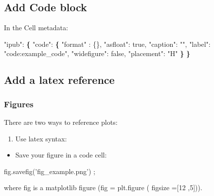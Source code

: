 \documentclass[10pt,parskip=half,
	toc=sectionentrywithdots,
	bibliography=totocnumbered,
	captions=tableheading,numbers=noendperiod]{scrartcl}
\providecommand{\tightlist}{%
  \setlength{\itemsep}{0pt}\setlength{\parskip}{0pt}}
\newenvironment{Shaded}{}{}
\newcommand{\KeywordTok}[1]{\textcolor[rgb]{0.00,0.44,0.13}{\textbf{{#1}}}}
\newcommand{\DataTypeTok}[1]{\textcolor[rgb]{0.56,0.13,0.00}{{#1}}}
\newcommand{\StringTok}[1]{\textcolor[rgb]{0.25,0.44,0.63}{{#1}}}
\newcommand{\FunctionTok}[1]{\textcolor[rgb]{0.02,0.16,0.49}{{#1}}}
\newcommand{\NormalTok}[1]{{#1}}
\newcommand{\OperatorTok}[1]{\textcolor[rgb]{0.40,0.40,0.40}{{#1}}}
\newcommand{\BuiltInTok}[1]{{#1}}
\begin{document}
\subsection{Add Code block}\label{add-code-block}

In the Cell metadata:

\begin{Shaded}
\begin{Highlighting}[]
\StringTok{"ipub"}\NormalTok{: }\KeywordTok{\{}
  \StringTok{"code"}\NormalTok{: }\KeywordTok{\{}
    \StringTok{"format"} \BuiltInTok{:} \DataTypeTok{\{\}}\NormalTok{,}
    \StringTok{"asfloat"}\NormalTok{: }\FunctionTok{true}\NormalTok{,}
    \StringTok{"caption"}\NormalTok{: }\StringTok{""}\NormalTok{,}
    \StringTok{"label"}\NormalTok{: }\StringTok{"code:example_code"}\NormalTok{,}
    \StringTok{"widefigure"}\NormalTok{: }\FunctionTok{false}\NormalTok{,}
    \StringTok{"placement"}\NormalTok{: }\StringTok{"H"}
    \KeywordTok{\}}
  \KeywordTok{\}}
\end{Highlighting}
\end{Shaded}

\subsection{Add a latex reference}\label{add-a-latex-reference}

\subsubsection{Figures}\label{figures}

There are two ways to reference plots:

\begin{enumerate}
\def\labelenumi{\arabic{enumi}.}
\tightlist
\item
  Use latex syntax:
\end{enumerate}

\begin{itemize}
\tightlist
\item
  Save your figure in a code cell:
\end{itemize}

\begin{Shaded}
\begin{Highlighting}[]
\NormalTok{fig.savefig(}\StringTok{'fig_example.png'}\NormalTok{) }\OperatorTok{;}
\end{Highlighting}
\end{Shaded}

where fig is a matplotlib figure (fig = plt.figure ( figsize ={[}12
,5{]})).
\end{document}
